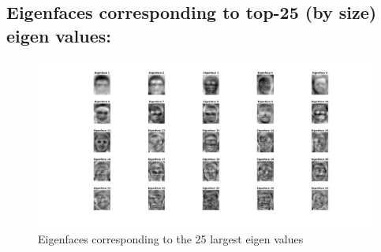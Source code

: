 \documentclass{article}
\begin{document}
\begin{enumerate}
\subsection{Eigenfaces corresponding to top-25 (by size) eigen values:}
\begin{figure}[H]
    \centering
    \includegraphics[width = 1.1\linewidth]{../images/Eigenfaces.jpg}
    \caption{Eigenfaces corresponding to the 25 largest eigen values}
    \label{fig:enter-label}
\end{figure}

\end{enumerate}
\end{document}
